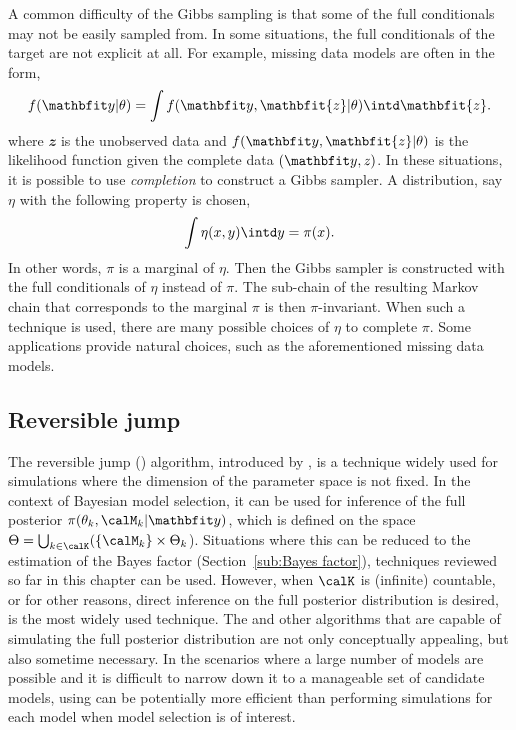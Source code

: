 A common difficulty of the Gibbs sampling is that some of the full
conditionals may not be easily sampled from. In some situations, the full
conditionals of the target are not explicit at all. For example, missing data
models are often in the form,
\begin{equation*}
  f(\data|\theta) = \int f(\data, \mathbfit{z}|\theta)\intd \mathbfit{z}.
\end{equation*}
where $\mathbfit{z}$ is the unobserved data and $f(\data,\mathbfit{z}|\theta)$
is the likelihood function given the complete data $(\data,\mathit{z})$. In
these situations, it is possible to use \emph{completion} to construct a Gibbs
sampler. A distribution, say $\eta$ with the following property is chosen,
\begin{equation}
  \int\eta(x,y)\intd y = \pi(x).
\end{equation}
In other words, $\pi$ is a marginal of $\eta$. Then the Gibbs sampler is
constructed with the full conditionals of $\eta$ instead of $\pi$. The
sub-chain of the resulting Markov chain that corresponds to the marginal
$\pi$ is then $\pi$-invariant. When such a technique is used, there are many
possible choices of $\eta$ to complete $\pi$. Some applications provide
natural choices, such as the aforementioned missing data models.

\subsection{Reversible jump \protect\mcmc}
\label{sub:Reversible jump mcmc}

The reversible jump \mcmc (\rjmcmc) algorithm, introduced by
\cite{Green:1995dg}, is a technique widely used for simulations where the
dimension of the parameter space is not fixed. In the context of Bayesian
model selection, it can be used for inference of the full posterior
$\pi(\theta_k,\calM_k|\data)$, which is defined on the space $\Theta =
\bigcup_{k\in\calK}(\{\calM_k\}\times\Theta_k$). Situations where this can be
reduced to the estimation of the Bayes factor (Section~\ref{sub:Bayes
factor}), techniques reviewed so far in this chapter can be used. However,
when $\calK$ is (infinite) countable, or for other reasons, direct inference
on the full posterior distribution is desired, \rjmcmc is the most widely
used technique. The \rjmcmc and other algorithms that are capable of
simulating the full posterior distribution are not only conceptually
appealing, but also sometime necessary. In the scenarios where a large number
of models are possible and it is difficult to narrow down it to a manageable
set of candidate models, using \rjmcmc can be potentially more efficient than
performing simulations for each model when model selection is of interest.

